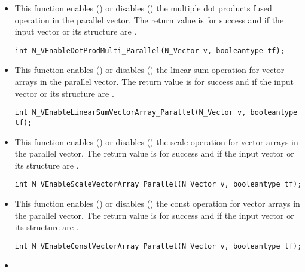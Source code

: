 \begin{itemize}

\item {}

This function enables () or disables () the multiple
dot products fused operation in the parallel vector. The return value is 
for success and  if the input vector or its  structure are
.

\verb|int N_VEnableDotProdMulti_Parallel(N_Vector v, booleantype tf);|


\item {}

This function enables () or disables () the linear sum
operation for vector arrays in the parallel vector. The return value is  for
success and  if the input vector or its  structure are .

\verb|int N_VEnableLinearSumVectorArray_Parallel(N_Vector v, booleantype tf);|


\item {}

This function enables () or disables () the scale
operation for vector arrays in the parallel vector. The return value is  for
success and  if the input vector or its  structure are .

\verb|int N_VEnableScaleVectorArray_Parallel(N_Vector v, booleantype tf);|


\item {}

This function enables () or disables () the const
operation for vector arrays in the parallel vector. The return value is  for
success and  if the input vector or its  structure are .

\verb|int N_VEnableConstVectorArray_Parallel(N_Vector v, booleantype tf);|


\item {}


\end{itemize}

